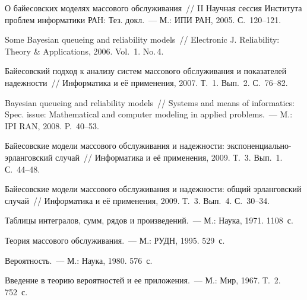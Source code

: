 \begin{multicols}{2}
{{\begin{thebibliography}{99}
О байесовских моделях массового обслуживания~// 
II Научная сессия Института проблем информатики РАН: Тез. докл.~--- М.: ИПИ РАН, 2005. С.~120--121.

Some Bayesian queueing and reliability models~// Electronic J. Reliability: Theory \& Applications, 
2006. Vol.~1. No.\,4.

Байесовский подход к анализу систем массового обслуживания и показателей надежности~// 
Информатика и её применения, 2007. Т.~1. Вып.~2. С.~76--82.

Bayesian queueing and reliability models~// Systems and means of informatics: Spec. issue: 
Mathematical and computer modeling in applied problems.~--- M.: IPI
RAN, 2008. P.~40--53.

Байесовские модели массового обслуживания и надежности: экспоненциально-эрланговский случай~// Информатика и её 
применения, 2009. Т.~3. Вып.~1. С.~44--48.

Байесовские модели массового обслуживания и надежности: общий эрланговский случай~// 
Информатика и её применения, 2009. Т.~3. Вып.~4. С.~30--34.

Таблицы интегралов, сумм, рядов и произведений.~--- М.: Наука, 1971. 1108~с.

Теория массового обслуживания.~---
М.: РУДН, 1995. 529~с.

Вероятность.~--- М.: Наука, 1980. 576~с.

\label{end\stat}


Введение в теорию вероятностей и ее приложения.~--- М.: Мир, 1967. Т.~2. 752~с.
 \end{thebibliography}
}
}

\end{multicols}